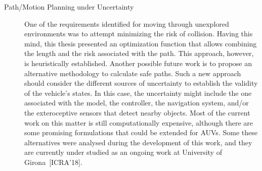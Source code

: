 \begin{description}
\item[Path/Motion Planning under Uncertainty] One of the requirements identified
for moving through unexplored environments was to attempt minimizing the risk of
collision. Having this mind, this thesis presented an optimization function that
allows combining the length and the risk associated with the path. This approach,
however, is heuristically established. Another possible future work is to
propose an alternative methodology to calculate safe paths. Such a new approach
should consider the different sources of uncertainty to establish the validity
of the vehicle's states. In this case, the uncertainty might include the one
associated with the model, the controller, the navigation system, and/or the
exteroceptive sensors that detect nearby objects. Most of the current work on
this matter is still computationally expensive, although there are some
promising formulations that could be extended for \acp{AUV}. Some these
alternatives were analysed during the development of this work, and they are
currently under studied as an ongoing work at University of Girona~[ICRA'18].

\end{description}

